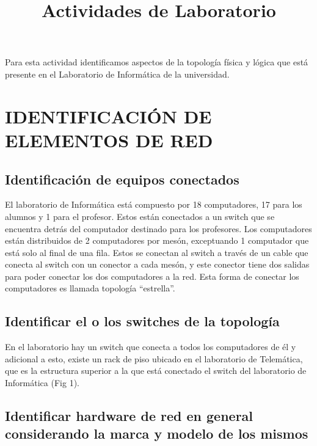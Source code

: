 \documentclass[onecolumn,11pts]{IEEEtran}
\begin{document}
\cleardoublepage

\cleardoublepage

\title{Actividades de Laboratorio}

\maketitle



       Para esta actividad identificamos aspectos de la topología física y lógica que está presente en el Laboratorio de Informática de la universidad.
       
\section{IDENTIFICACIÓN DE ELEMENTOS DE RED}

\subsection{Identificación de equipos conectados} 

        El laboratorio de Informática está compuesto por 18 computadores, 17 para los alumnos y 1 para el profesor. Estos están conectados a un switch que se encuentra detrás del computador destinado para los profesores. Los computadores están distribuidos de 2 computadores por mesón, exceptuando 1 computador que está solo al final de una fila. Estos se conectan al switch a través de un cable que conecta al switch con un conector a cada mesón, y este conector tiene dos salidas para poder conectar los dos computadores a la red. Esta forma de conectar los computadores es llamada topología “estrella”.
        
\subsection{Identificar el o los switches de la topología} 

        En el laboratorio hay un switch que conecta a todos los computadores de él y adicional a esto, existe un rack de piso ubicado en el laboratorio de Telemática, que es la estructura superior a la que está conectado el switch del laboratorio de Informática (Fig 1).

\subsection{Identificar hardware de red en general considerando la marca y modelo de los mismos}   
\end{document}
